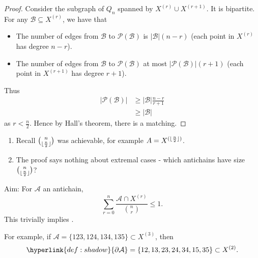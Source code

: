 \documentclass{article}
\DeclarePairedDelimiter\floor{\lfloor}{\rfloor}
\begin{document}
\begin{proof}
  Consider the subgraph of $Q_n$ spanned by $X^{(r)} \cup X^{(r+1)}$. It is bipartite.
  For any $\mathcal{B} \subseteq X^{(r)}$, we have that
  \begin{itemize}
    \item The number of edges from $\mathcal{B}$ to $\mathcal{P}(\mathcal{B})$ is $|\mathcal{B}| (n-r)$ (each point in $X^{(r)}$ has degree $n-r$).
    \item The number of edges from $\mathcal{B}$ to $\mathcal{P}(\mathcal{B})$ at most $|\mathcal{P}(\mathcal{B})| (r+1)$ (each point in $X^{(r+1)}$ has degree $r+1$).
  \end{itemize}
  \begin{center}
  \end{center}
  Thus
  \begin{align*}
    |\mathcal{P}(\mathcal{B})| &\geq |\mathcal{B}| \frac{n-r}{r+1} \\
                               &\geq |\mathcal{B}|
  \end{align*}
  as $r < \frac{n}{2}$.
  Hence by Hall's theorem, there is a matching.
\end{proof}

\begin{remark}\leavevmode
  \begin{enumerate}[label=]
    \item Recall $\binom{n}{\floor{\frac{n}{2}}}$ was achievable, for example $A = X^{(\floor{\frac{n}{2}})}$.
    \item The proof says nothing about extremal cases - which antichains have size $\binom{n}{\floor{\frac{n}{2}}}$?
  \end{enumerate}
\end{remark}

Aim: For $\mathcal{A}$ an antichain,
\begin{equation*}
  \sum_{r=0}^n \frac{\mathcal{A} \cap X^{(r)}}{\binom{n}{r}} \leq 1.
\end{equation*}
This trivially implies .

For example, if $\mathcal{A} = \{123,124,134,135\} \subset X^{(3)}$, then
\begin{equation*}\hyperlink{def:shadow}{\partial \mathcal{A}} = \{12,13,23,24,34,15,35\} \subset X^{(2)}.\end{equation*}
\end{document}
